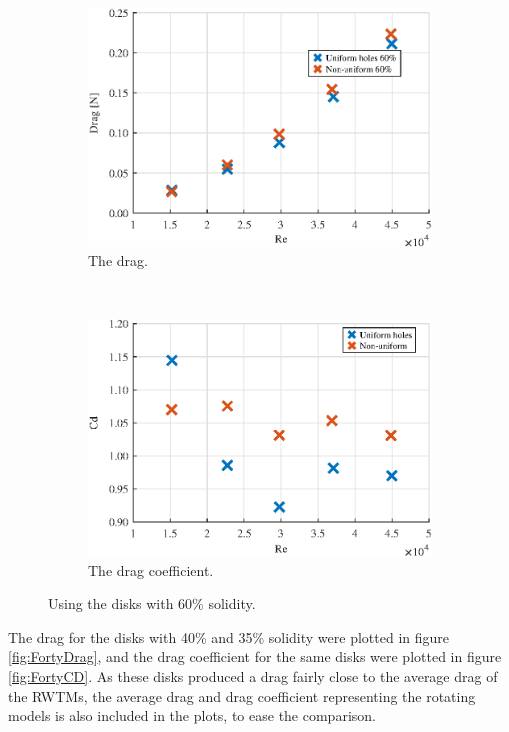 \begin{figure} 
    \centering
    \begin{subfigure}[b]{0.45\linewidth}
        \includegraphics[width=\textwidth]{0_Images/SixtyDragRe.eps}
        \caption{The drag.}
        \label{Fig:SixtyDrag}
    \end{subfigure}
    ~
    \begin{subfigure}[b]{0.45\linewidth}
        \includegraphics[width=\textwidth]{0_Images/SixtyCDRe.eps}
        \caption{The drag coefficient.}
        \label{Fig:SixtyCD}
    \end{subfigure}
    \caption{Using the disks with 60\% solidity.}
    \label{fig:SixtyDisk}
\end{figure}


The drag for the disks with 40\% and 35\% solidity were plotted in figure \ref{fig:FortyDrag}, and the drag coefficient for the same disks were plotted in figure \ref{fig:FortyCD}. As these disks produced a drag fairly close to the average drag of the \gls{RWTM}s, the average drag and drag coefficient representing the rotating models is also included in the plots, to ease the comparison. 



